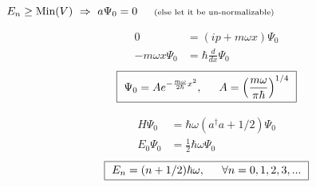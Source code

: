 \documentclass[12pt]{article}
\begin{document}
\hfill \break \\
\( E_n \geq \text{Min}(V) \ \Rightarrow{} \ a \Psi_0 = 0
    \indent \text{\scriptsize (else let it be un-normalizable)} \)\\[5pt]
\begin{minipage}[t]{0.45\textwidth}
    \setlength{\parindent}{.5cm}
    \vspace{-.5cm}
    \begin{align*}
        0 &= (ip + m \omega x) \Psi_0\\[5pt]
        - m \omega x \Psi_0 &= \hbar \tfrac{d}{dx} \Psi_0
    \end{align*}
    \[ \boxed{ \ \Psi_0 = A e^{- \frac{m \omega}{2 \hbar}x^2}, \indent A 
        = \left( \frac{m \omega }{\pi \hbar} \right)^{1/4} \ } \]
\end{minipage}
\begin{minipage}[t]{0.5\textwidth}
    \setlength{\parindent}{.5cm}
    \vspace{-.5cm}
    \begin{align*}
        H \Psi_0 &= \hbar \omega (a^\dagger a + 1/2) \Psi_0\\[5pt]
        E_0 \Psi_0 &= \tfrac{1}{2} \hbar \omega \Psi_0
    \end{align*}
    \[ \boxed{ \ E_n = (n+1/2) \hbar \omega, \indent \forall n=0, 1, 2, 3, ... \ } \]
\end{minipage}
\end{document}
